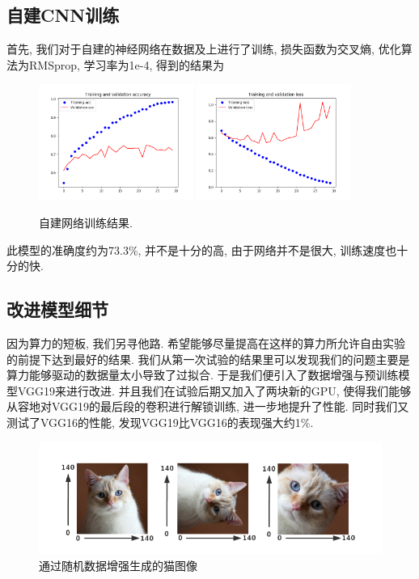 \documentclass[lang=cn,11pt]{elegantpaper}
\begin{document}
\subsection{自建CNN训练}
首先, 我们对于自建的神经网络在数据及上进行了训练, 损失函数为交叉熵, 优化算法为RMSprop, 学习率为1e-4, 得到的结果为
\begin{figure}[htbp]
	\centering
	  \includegraphics[width=0.45\textwidth]{small_without_aug_1}
	  \includegraphics[width=0.45\textwidth]{small_without_aug_2}
	  \caption{自建网络训练结果.}
\end{figure}

此模型的准确度约为73.3\%, 并不是十分的高, 由于网络并不是很大, 训练速度也十分的快. 
\subsection{改进模型细节}

因为算力的短板, 我们另寻他路. 希望能够尽量提高在这样的算力所允许自由实验的前提下达到最好的结果. 我们从第一次试验的结果里可以发现我们的问题主要是算力能够驱动的数据量太小导致了过拟合. 于是我们便引入了数据增强与预训练模型VGG19来进行改进. 并且我们在试验后期又加入了两块新的GPU, 使得我们能够从容地对VGG19的最后段的卷积进行解锁训练, 进一步地提升了性能. 同时我们又测试了VGG16的性能, 发现VGG19比VGG16的表现强大约1\%. 
\begin{figure}[htbp]
	\centering
	  \includegraphics{aug.png}
	  \caption{通过随机数据增强生成的猫图像\label{fig:augcat}}
	\end{figure}
\end{document}
